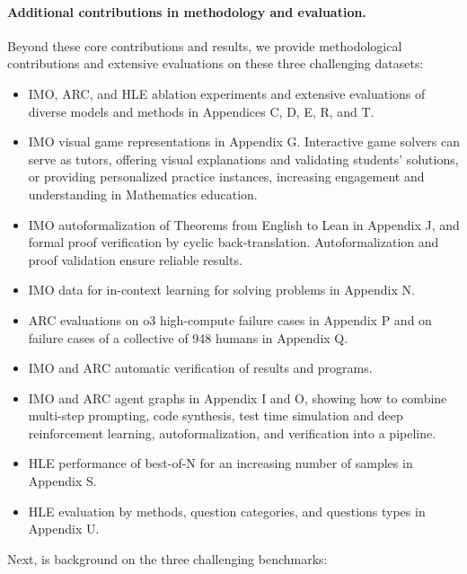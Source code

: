 \paragraph{Additional contributions in methodology and evaluation.} Beyond these core contributions and results, we provide methodological contributions and extensive evaluations on these three challenging datasets:
\begin{itemize}
\item IMO, ARC, and HLE ablation experiments and extensive evaluations of diverse models and methods in Appendices C, D, E, R, and T.
\item IMO visual game representations in Appendix G. Interactive game solvers can serve as tutors, offering visual explanations and validating students’ solutions, or providing personalized practice instances, increasing engagement and understanding in Mathematics education.
\item IMO autoformalization of Theorems from English to Lean in Appendix J, and formal proof verification by cyclic back-translation. Autoformalization and proof validation ensure reliable results.
\item IMO data for in-context learning for solving problems in Appendix N.
\item ARC evaluations on o3 high-compute failure cases in Appendix P and on failure cases of a collective of 948 humans in Appendix Q.
\item IMO and ARC automatic verification of results and programs.
\item IMO and ARC agent graphs in Appendix I and O, showing how to combine multi-step prompting, code synthesis, test time simulation and deep reinforcement learning, autoformalization, and verification into a pipeline.
\item HLE performance of best-of-N for an increasing number of samples in Appendix S.
\item HLE evaluation by methods, question categories, and questions types in Appendix U.
\end{itemize}

Next, is background on the three challenging benchmarks: 

